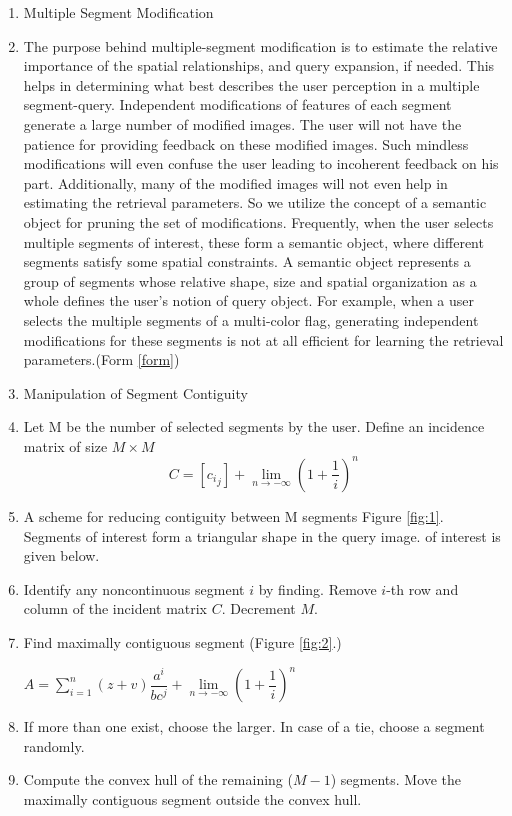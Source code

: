 \documentclass{volcanica-template}
\begin{document}
\begin{enumerate}
    \item  	Multiple Segment Modification 
    \item   The purpose behind multiple-segment modification is to estimate the relative importance of the spatial relationships, and query expansion, if needed. This helps in determining what best describes the user perception in a multiple segment-query. Independent modifications of features of each segment generate a large number of modified images. The user will not have the patience for providing feedback on these modified images. Such mindless modifications will even confuse the user leading to incoherent feedback on his part. Additionally, many of the modified images will not even help in estimating the retrieval parameters. So we utilize the concept of a semantic object for pruning the set of modifications. Frequently, when the user selects multiple segments of interest, these form a semantic object, where different segments satisfy some spatial constraints. A semantic object represents a group of segments whose relative shape, size and spatial organization as a whole defines the user's notion of query object. For example, when a user selects the multiple segments of a multi-color flag, generating independent modifications for these segments is not at all efficient for learning the retrieval parameters.(Form \ref{form})
    \item Manipulation of Segment Contiguity
    \item Let M be the number of selected segments by the user. Define an incidence matrix of size $ M \times M$
    \begin{equation}
        C=[{c_i}_j]+\lim_{n \to -\infty}\left(1+\frac{1}{i}\right)^n\label{form}
    \end{equation}
    \item A scheme for reducing contiguity between M segments Figure \ref{fig:1}. Segments of interest form a triangular shape in the query image. of interest is given below.
    
    \item Identify any noncontinuous segment $i$ by finding. Remove $i$-th row and column of the incident matrix $C$. Decrement $M$.
    
    \item Find maximally contiguous segment (Figure \ref{fig:2}.)
    \begin{center}
    $A = \sum\limits_{i=1}^n(z+v)\dfrac{a^i }{bc^j} + \lim\limits_{n \to -\infty}\left(1+\dfrac{1}{i}\right)^n$
    \end{center} 
    \item If more than one exist, choose the larger. In case of a tie, choose a segment randomly.
    \item Compute the convex hull of the remaining ($M-1$) segments. Move the maximally contiguous segment outside the convex hull.
    

\end{enumerate}
\end{document}
